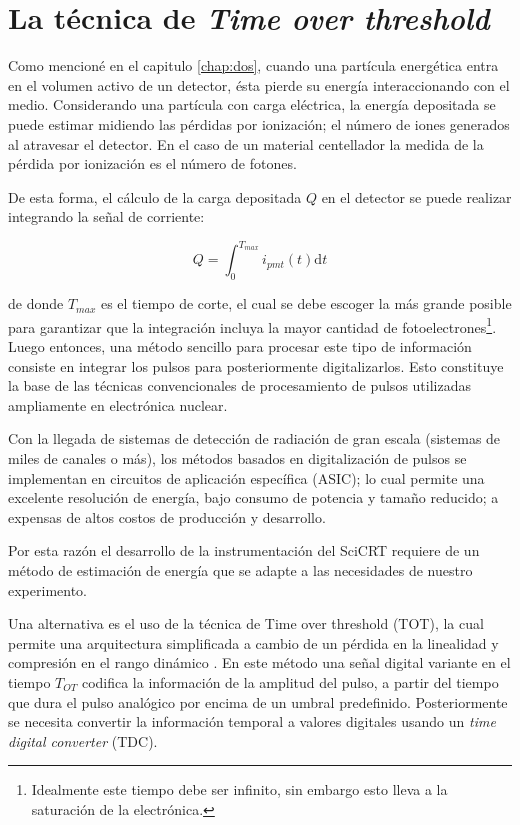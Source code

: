 \section{La técnica de \emph{Time over threshold}}
\label{sec:time-over}
Como mencioné en el capitulo \ref{chap:dos}, cuando una partícula energética entra en el volumen activo de un detector, ésta pierde su energía interaccionando con el medio. Considerando una partícula con carga eléctrica, la energía depositada se puede estimar midiendo las pérdidas por ionización; el número de iones generados al atravesar el detector. En el caso de un material centellador la medida de la pérdida por ionización es el número de fotones.

De esta forma, el cálculo de la carga depositada $Q$ en el detector se puede realizar integrando la señal de corriente:

\begin{equation}
\label{equ:charge}
Q=\int_{0}^{T_{max}} i_{pmt}\left(t\right)\mathrm{d}t
\end{equation}

de donde $T_{max}$ es el tiempo de corte, el cual se debe escoger la más grande posible para garantizar que la integración incluya la mayor cantidad de fotoelectrones\footnote{Idealmente este tiempo debe ser infinito, sin embargo esto lleva a la saturación de la electrónica.}. Luego entonces, una método sencillo para procesar este tipo de información consiste en integrar los pulsos para posteriormente digitalizarlos. Esto constituye la base de las técnicas convencionales de procesamiento de pulsos utilizadas ampliamente en electrónica nuclear.

Con la llegada de sistemas de detección de radiación de gran escala (sistemas de miles de canales o más), los métodos basados en digitalización de pulsos se implementan en circuitos de aplicación específica (ASIC); lo cual permite una excelente resolución de energía, bajo consumo de potencia y tamaño reducido; a expensas de altos costos de producción y desarrollo.

Por esta razón el desarrollo de la instrumentación del SciCRT requiere de un método de estimación de energía que se adapte a las necesidades de nuestro experimento.

Una alternativa es el uso de la técnica de Time over threshold (TOT), la cual permite una arquitectura simplificada a cambio de un pérdida en la linealidad y compresión en el rango dinámico \cite{fujiwara10}. En este método una señal digital variante en el tiempo $T_{OT}$ codifica la información de la amplitud del pulso, a partir del tiempo que dura el pulso analógico por encima de un umbral predefinido. Posteriormente se necesita convertir la información temporal a valores digitales usando un \emph{time digital converter} (TDC).

